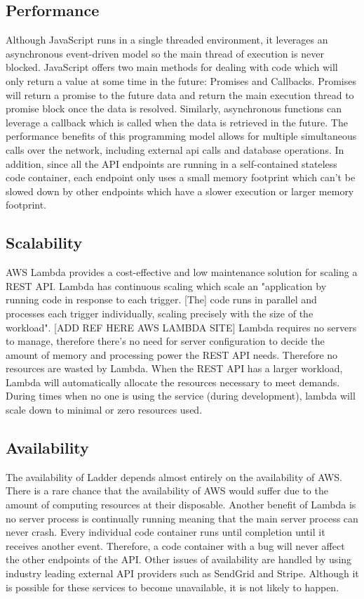 \documentclass[conference]{IEEEtran}
\begin{document}
\subsection{Performance}
Although JavaScript runs in a single threaded environment, it leverages an asynchronous event-driven model so the main thread of execution is never blocked. JavaScript offers two main methods for dealing with code which will only return a value at some time in the future: Promises and Callbacks. Promises will return a promise to the future data and return the main execution thread to promise block once the data is resolved. Similarly, asynchronous functions can leverage a callback which is called when the data is retrieved in the future. The performance benefits of this programming model allows for multiple simultaneous calls over the network, including external api calls and database operations. In addition, since all the API endpoints are running in a self-contained stateless code container, each endpoint only uses a small memory footprint which can't be slowed down by other endpoints which have a slower execution or larger memory footprint.

\subsection{Scalability}
AWS Lambda provides a cost-effective and low maintenance solution for scaling a REST API. Lambda has continuous scaling which scale an "application by running code in response to each trigger. [The] code runs in parallel and processes each trigger individually, scaling precisely with the size of the workload". [ADD REF HERE AWS LAMBDA SITE] Lambda requires no servers to manage, therefore there's no need for server configuration to decide the amount of memory and processing power the REST API needs. Therefore no resources are wasted by Lambda. When the REST API has a larger workload, Lambda will automatically allocate the resources necessary to meet demands. During times when no one is using the service (during development), lambda will scale down to minimal or zero resources used.

\subsection{Availability}
The availability of Ladder depends almost entirely on the availability of AWS. There is a rare chance that the availability of AWS would suffer due to the amount of computing resources at their disposable. Another benefit of Lambda is no server process is continually running meaning that the main server process can never crash. Every individual code container runs until completion until it receives another event. Therefore, a code container with a bug will never affect the other endpoints of the API. Other issues of availability are handled by using industry leading external API providers such as SendGrid and Stripe. Although it is possible for these services to become unavailable, it is not likely to happen.
\end{document}
